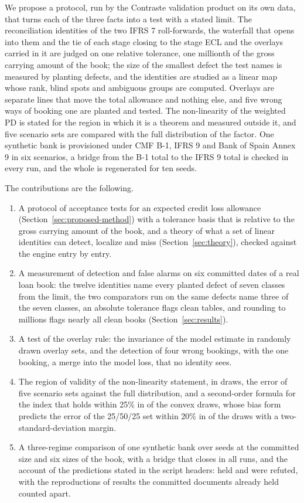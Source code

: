 We propose a protocol, run by the Contraste validation product on its own data, that turns each of the three facts into a test with a stated limit.
The reconciliation identities of the two IFRS 7 roll-forwards, the waterfall that opens into them and the tie of each stage closing to the stage ECL and the overlays carried in it are judged on one relative tolerance, one millionth of the gross carrying amount of the book; the size of the smallest defect the test names is measured by planting defects, and the identities are studied as a linear map whose rank, blind spots and ambiguous groups are computed.
Overlays are separate lines that move the total allowance and nothing else, and five wrong ways of booking one are planted and tested.
The non-linearity of the weighted PD is stated for the region in which it is a theorem and measured outside it, and five scenario sets are compared with the full distribution of the factor.
One synthetic bank is provisioned under CMF B-1, IFRS 9 and Bank of Spain Annex 9 in six scenarios, a bridge from the B-1 total to the IFRS 9 total is checked in every run, and the whole is regenerated for ten seeds.

The contributions are the following.
\begin{enumerate}
\item A protocol of acceptance tests for an expected credit loss allowance (Section~\ref{sec:proposed-method}) with a tolerance basis that is relative to the gross carrying amount of the book, and a theory of what a set of linear identities can detect, localize and miss (Section~\ref{sec:theory}), checked against the engine entry by entry.
\item A measurement of detection and false alarms on six committed dates of a real loan book: the twelve identities name every planted defect of seven classes from the limit, the two comparators run on the same defects name three of the seven classes, an absolute tolerance flags clean tables, and rounding to millions flags nearly all clean books (Section~\ref{sec:results}).
\item A test of the overlay rule: the invariance of the model estimate in \ethreeSets{} randomly drawn overlay sets, and the detection of four wrong bookings, with the one booking, a merge into the model loss, that no identity sees.
\item The region of validity of the non-linearity statement, in \efourDraws{} draws, the error of five scenario sets against the full distribution, and a second-order formula for the index that holds within 25\% in \efourSecondWithin{} of the convex draws, whose bias form predicts the error of the 25/50/25 set within 20\% in \efourBiasWithin{} of the draws with a two-standard-deviation margin.
\item A three-regime comparison of one synthetic bank over \efiveSeeds{} seeds at the committed size and six sizes of the book, with a bridge that closes in all \efiveCells{} runs, and the account of the \hypTotal{} predictions stated in the script headers: \hypHeld{} held and \hypRefuted{} were refuted, with the \hypReproTotal{} reproductions of results the committed documents already held counted apart.
\end{enumerate}

